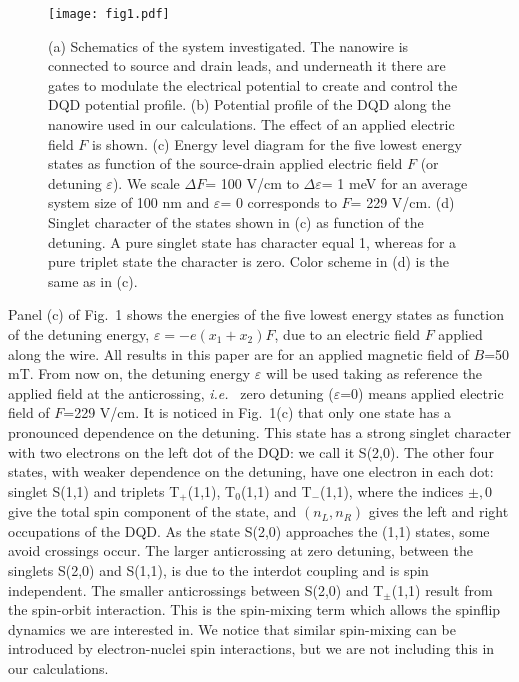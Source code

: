 \documentclass[prb,twocolumn,showpacs,floats]{revtex4}
\begin{document}
\begin{figure}[htbp]
\texttt{[image: fig1.pdf]} 
\caption{
(a) Schematics of the system investigated. The nanowire is connected
to source and drain leads, and underneath it there are gates to
modulate the electrical potential to create and control the DQD potential profile.
 (b) Potential profile of the DQD along the nanowire used in our calculations.
 The effect of an applied electric field $F$ is shown.
 (c) Energy level diagram for the five lowest energy states as function
 of the source-drain applied electric field $F$ (or detuning $\varepsilon$). 
 We scale $\Delta F$= 100 V/cm to $\Delta \varepsilon$= 1 meV
 for an average system size of 100 nm and $ \varepsilon$= 0 corresponds
 to $ F$= 229 V/cm.
(d) Singlet character of the states shown in (c) as function of the 
detuning. A pure singlet state has character equal 1, whereas for a pure
triplet state the character is zero. Color scheme in (d) is the same as in (c).
}

\end{figure}


Panel (c) of Fig.~1 shows the energies of the five lowest energy states as function of the
detuning energy, $ \varepsilon= - e (x_1+x_2)F$, due to an electric field $F$ applied along the wire. 
All results in this paper are for an applied
magnetic field of $B$=50 mT. From now on, the detuning energy $ \varepsilon$ will
be used taking as reference the applied field at the anticrossing, \textit{i.e.}~ zero detuning ($\varepsilon$=0)
means applied electric field of $F$=229 V/cm. 
It is noticed in Fig.~1(c) that only one state
has a pronounced dependence on the detuning. This state has a strong singlet character with two electrons
on the left dot of the DQD: we call it S(2,0). The other four states, with weaker dependence on the detuning,
have one electron in each dot: singlet S(1,1) and triplets T$_+$(1,1), T$_0$(1,1) and T$_{-}$(1,1), where
the indices $\pm, 0$  give the total spin component of the state, and $(n_L,n_R)$ gives the
left and right occupations of the DQD. 
As the state S(2,0) approaches the (1,1) states, some avoid crossings occur. The larger anticrossing at zero detuning,
between the singlets S(2,0) and S(1,1), is due to the interdot coupling and is spin independent.
The smaller anticrossings between S(2,0) and T$_\pm$(1,1) result from the spin-orbit interaction. This
is the spin-mixing term which allows the spinflip dynamics we are interested in. 
We notice that similar spin-mixing can be introduced by electron-nuclei spin interactions,\cite{koppens} 
but we are not including this in our calculations.
\end{document}
